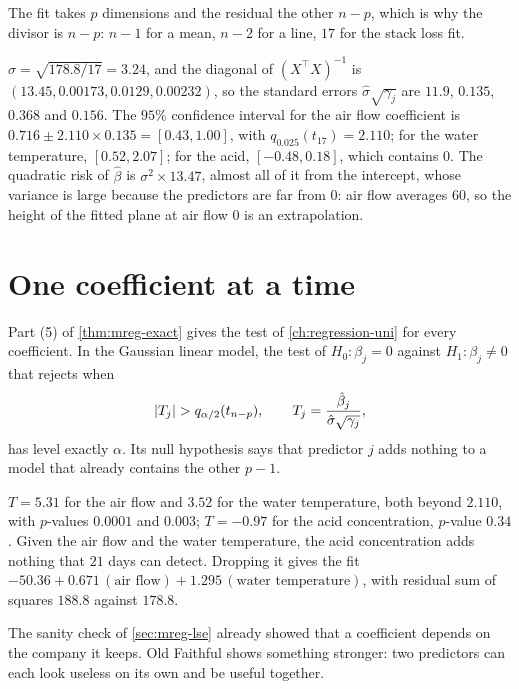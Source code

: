 The fit takes $p$ dimensions and the residual the other $n - p$, which is why the divisor is $n - p$: $n - 1$ for a mean, $n - 2$ for a line, $17$ for the stack loss fit.

\begin{worked}
$\hat{\sigma} = \sqrt{178.8/17} = 3.24$, and the diagonal of $(X^\top X)^{-1}$ is $(13.45, 0.00173, 0.0129, 0.00232)$, so the standard errors $\hat{\sigma}\sqrt{\gamma_j}$ are $11.9$, $0.135$, $0.368$ and $0.156$. The $95\%$ confidence interval for the air flow coefficient is $0.716 \pm 2.110 \times 0.135 = [0.43, 1.00]$, with $q_{0.025}(t_{17}) = 2.110$; for the water temperature, $[0.52, 2.07]$; for the acid, $[-0.48, 0.18]$, which contains $0$. The quadratic risk of $\hat{\beta}$ is $\sigma^2 \times 13.47$, almost all of it from the intercept, whose variance is large because the predictors are far from $0$: air flow averages $60$, so the height of the fitted plane at air flow $0$ is an extrapolation.
\end{worked}

\section{One coefficient at a time}
\label{sec:mreg-ttest}

Part (5) of \cref{thm:mreg-exact} gives the test of \cref{ch:regression-uni} for every coefficient.
In the Gaussian linear model, the test of $H_0: \beta_j = 0$ against $H_1: \beta_j \neq 0$ that rejects when
\[
\lvert T_j\rvert > q_{\alpha/2}(t_{n-p}), \qquad T_j = \frac{\hat{\beta}_j}{\hat{\sigma}\sqrt{\gamma_j}},
\]
has level exactly $\alpha$.
Its null hypothesis says that predictor $j$ adds nothing to a model that already contains the other $p - 1$.

\begin{worked}
$T = 5.31$ for the air flow and $3.52$ for the water temperature, both beyond $2.110$, with $p$-values $0.0001$ and $0.003$; $T = -0.97$ for the acid concentration, $p$-value $0.34$. Given the air flow and the water temperature, the acid concentration adds nothing that $21$ days can detect. Dropping it gives the fit $-50.36 + 0.671\,(\text{air flow}) + 1.295\,(\text{water temperature})$, with residual sum of squares $188.8$ against $178.8$.
\end{worked}

The sanity check of \cref{sec:mreg-lse} already showed that a coefficient depends on the company it keeps.
Old Faithful shows something stronger: two predictors can each look useless on its own and be useful together.

